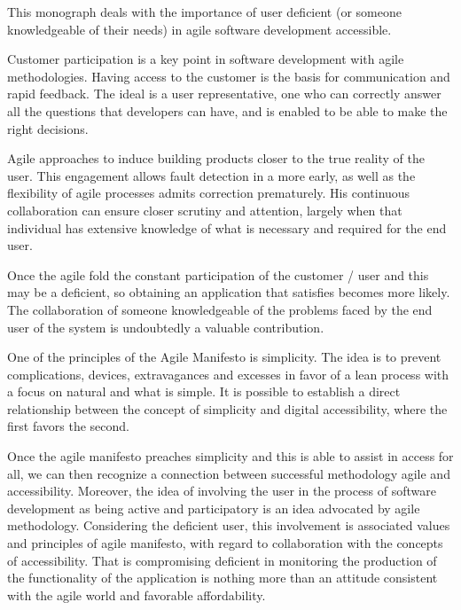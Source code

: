 \abstract
\setlength{\parskip}{2ex plus 0.5ex minus 0.2ex}
\onehalfspacing
\setlength{\parindent}{40pt}
\vspace{-.85cm}

This monograph deals with the importance of user deficient (or someone knowledgeable of their needs) in agile software development accessible.

Customer participation is a key point in software development with agile methodologies. Having access to the customer is the basis for communication and rapid feedback. The ideal is a user representative, one who can correctly answer all the questions that developers can have, and is enabled to be able to make the right decisions.

Agile approaches to induce building products closer to the true reality of the user. This engagement allows fault detection in a more early, as well as the flexibility of agile processes admits correction prematurely. His continuous collaboration can ensure closer scrutiny and attention, largely when that individual has extensive knowledge of what is necessary and required for the end user.

Once the agile fold the constant participation of the customer / user and this may be a deficient, so obtaining an application that satisfies becomes more likely. The collaboration of someone knowledgeable of the problems faced by the end user of the system is undoubtedly a valuable contribution.

One of the principles of the Agile Manifesto is simplicity. The idea is to prevent complications, devices, extravagances and excesses in favor of a lean process with a focus on natural and what is simple. It is possible to establish a direct relationship between the concept of simplicity and digital accessibility, where the first favors the second.

Once the agile manifesto preaches simplicity and this is able to assist in access for all, we can then recognize a connection between successful methodology agile and accessibility. Moreover, the idea of involving the user in the process of software development as being active and participatory is an idea advocated by agile methodology. Considering the deficient user, this involvement is associated values and principles of agile manifesto, with regard to collaboration with the concepts of accessibility. That is compromising deficient in monitoring the production of the functionality of the application is nothing more than an attitude consistent with the agile world and favorable affordability.

